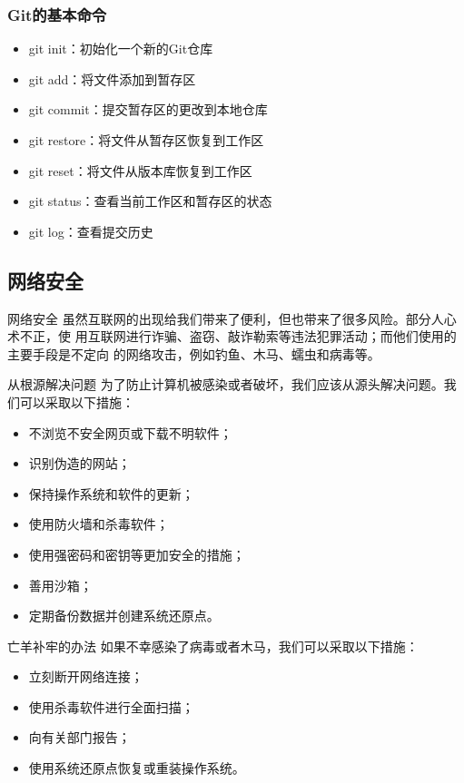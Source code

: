 \documentclass{beamer}
\begin{document}
\begin{frame}
    \frametitle{Git的基本命令}
    \begin{itemize}
        \item git init：初始化一个新的Git仓库
        \item git add：将文件添加到暂存区
        \item git commit：提交暂存区的更改到本地仓库
        \item git restore：将文件从暂存区恢复到工作区
        \item git reset：将文件从版本库恢复到工作区
        \item git status：查看当前工作区和暂存区的状态
        \item git log：查看提交历史
    \end{itemize}
\end{frame}
\subsection{网络安全}

\begin{frame}{网络安全}
    虽然互联网的出现给我们带来了便利，但也带来了很多风险。部分人心术不正，使
    用互联网进行诈骗、盗窃、敲诈勒索等违法犯罪活动；而他们使用的主要手段是不定向
    的网络攻击，例如钓鱼、木马、蠕虫和病毒等。
\end{frame}

\begin{frame}{从根源解决问题}
    为了防止计算机被感染或者破坏，我们应该从源头解决问题。我们可以采取以下措施：
    \begin{itemize}
        \item 不浏览不安全网页或下载不明软件；
        \item 识别伪造的网站；
        \item 保持操作系统和软件的更新；
        \item 使用防火墙和杀毒软件；
        \item 使用强密码和密钥等更加安全的措施；
        \item 善用沙箱；
        \item 定期备份数据并创建系统还原点。
    \end{itemize}
\end{frame}

\begin{frame}{亡羊补牢的办法}
    如果不幸感染了病毒或者木马，我们可以采取以下措施：
    \begin{itemize}
        \item 立刻断开网络连接；
        \item 使用杀毒软件进行全面扫描；
        \item 向有关部门报告；
        \item 使用系统还原点恢复或重装操作系统。
    \end{itemize}
\end{frame}
\end{document}
